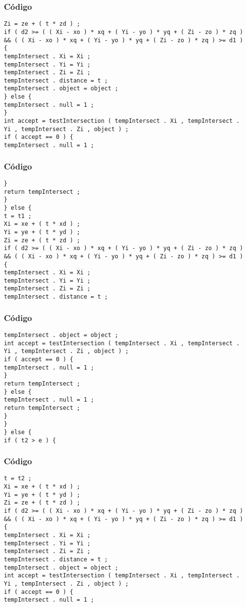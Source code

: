\documentclass{beamer}
\begin{document}
\begin{frame}[fragile]
\frametitle{C\'odigo}
\begin{verbatim}
Zi = ze + ( t * zd ) ; 
if ( d2 >= ( ( Xi - xo ) * xq + ( Yi - yo ) * yq + ( Zi - zo ) * zq ) && ( ( Xi - xo ) * xq + ( Yi - yo ) * yq + ( Zi - zo ) * zq ) >= d1 ) { 
tempIntersect . Xi = Xi ; 
tempIntersect . Yi = Yi ; 
tempIntersect . Zi = Zi ; 
tempIntersect . distance = t ; 
tempIntersect . object = object ; 
} else { 
tempIntersect . null = 1 ; 
} 
int accept = testIntersection ( tempIntersect . Xi , tempIntersect . Yi , tempIntersect . Zi , object ) ; 
if ( accept == 0 ) { 
tempIntersect . null = 1 ; 
\end{verbatim}
\end{frame}
\begin{frame}[fragile]
\frametitle{C\'odigo}
\begin{verbatim}
} 
return tempIntersect ; 
} 
} else { 
t = t1 ; 
Xi = xe + ( t * xd ) ; 
Yi = ye + ( t * yd ) ; 
Zi = ze + ( t * zd ) ; 
if ( d2 >= ( ( Xi - xo ) * xq + ( Yi - yo ) * yq + ( Zi - zo ) * zq ) && ( ( Xi - xo ) * xq + ( Yi - yo ) * yq + ( Zi - zo ) * zq ) >= d1 ) { 
tempIntersect . Xi = Xi ; 
tempIntersect . Yi = Yi ; 
tempIntersect . Zi = Zi ; 
tempIntersect . distance = t ; 
\end{verbatim}
\end{frame}
\begin{frame}[fragile]
\frametitle{C\'odigo}
\begin{verbatim}
tempIntersect . object = object ; 
int accept = testIntersection ( tempIntersect . Xi , tempIntersect . Yi , tempIntersect . Zi , object ) ; 
if ( accept == 0 ) { 
tempIntersect . null = 1 ; 
} 
return tempIntersect ; 
} else { 
tempIntersect . null = 1 ; 
return tempIntersect ; 
} 
} 
} else { 
if ( t2 > e ) { 
\end{verbatim}
\end{frame}
\begin{frame}[fragile]
\frametitle{C\'odigo}
\begin{verbatim}
t = t2 ; 
Xi = xe + ( t * xd ) ; 
Yi = ye + ( t * yd ) ; 
Zi = ze + ( t * zd ) ; 
if ( d2 >= ( ( Xi - xo ) * xq + ( Yi - yo ) * yq + ( Zi - zo ) * zq ) && ( ( Xi - xo ) * xq + ( Yi - yo ) * yq + ( Zi - zo ) * zq ) >= d1 ) { 
tempIntersect . Xi = Xi ; 
tempIntersect . Yi = Yi ; 
tempIntersect . Zi = Zi ; 
tempIntersect . distance = t ; 
tempIntersect . object = object ; 
int accept = testIntersection ( tempIntersect . Xi , tempIntersect . Yi , tempIntersect . Zi , object ) ; 
if ( accept == 0 ) { 
tempIntersect . null = 1 ; 
\end{verbatim}
\end{frame}
\end{document}
